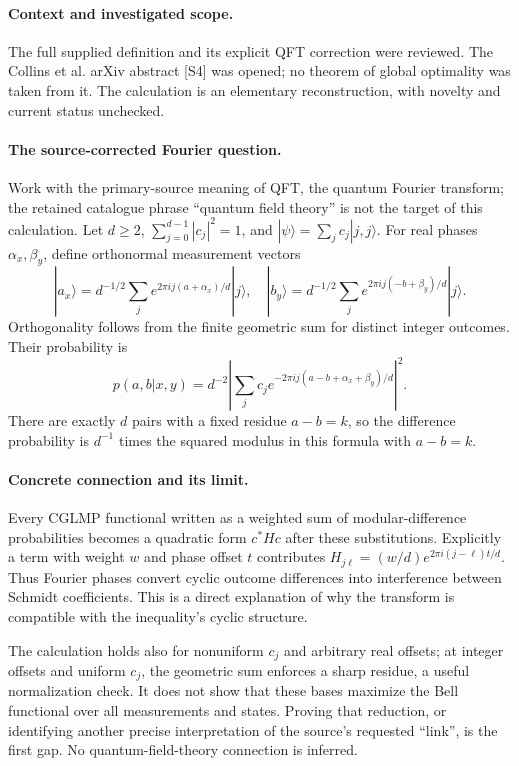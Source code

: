 \documentclass[11pt]{article}
\begin{document}
\paragraph{Context and investigated scope.} The full supplied definition and its explicit QFT correction were reviewed. The Collins et al. arXiv abstract [S4] was opened; no theorem of global optimality was taken from it. The calculation is an elementary reconstruction, with novelty and current status unchecked.

\paragraph{The source-corrected Fourier question.} Work with the primary-source meaning of QFT, the quantum Fourier transform; the retained catalogue phrase ``quantum field theory'' is not the target of this calculation. Let $d\geq2$, $\sum_{j=0}^{d-1}|c_j|^2=1$, and $|\psi\rangle=\sum_jc_j|j,j\rangle$. For real phases $\alpha_x,\beta_y$, define orthonormal measurement vectors
\[
 |a_x\rangle=d^{-1/2}\sum_j e^{2\pi i j(a+\alpha_x)/d}|j\rangle,
 \quad |b_y\rangle=d^{-1/2}\sum_j e^{2\pi i j(-b+\beta_y)/d}|j\rangle.
\]
Orthogonality follows from the finite geometric sum for distinct integer outcomes. Their probability is
\[
 p(a,b|x,y)=d^{-2}\left|\sum_jc_j e^{-2\pi i j(a-b+\alpha_x+\beta_y)/d}\right|^2.
\]
There are exactly $d$ pairs with a fixed residue $a-b=k$, so the difference probability is $d^{-1}$ times the squared modulus in this formula with $a-b=k$.

\paragraph{Concrete connection and its limit.} Every CGLMP functional written as a weighted sum of modular-difference probabilities becomes a quadratic form $c^*Hc$ after these substitutions. Explicitly a term with weight $w$ and phase offset $t$ contributes $H_{j\ell}=(w/d)e^{2\pi i(j-\ell)t/d}$. Thus Fourier phases convert cyclic outcome differences into interference between Schmidt coefficients. This is a direct explanation of why the transform is compatible with the inequality's cyclic structure.

The calculation holds also for nonuniform $c_j$ and arbitrary real offsets; at integer offsets and uniform $c_j$, the geometric sum enforces a sharp residue, a useful normalization check. It does not show that these bases maximize the Bell functional over all measurements and states. Proving that reduction, or identifying another precise interpretation of the source's requested ``link'', is the first gap. No quantum-field-theory connection is inferred.
\end{document}
